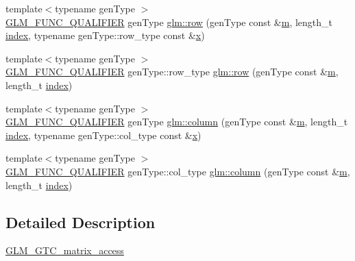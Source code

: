 \begin{DoxyCompactItemize}
\item 
{\footnotesize template$<$typename gen\+Type $>$ }\\\mbox{\hyperlink{setup_8hpp_a33fdea6f91c5f834105f7415e2a64407}{G\+L\+M\+\_\+\+F\+U\+N\+C\+\_\+\+Q\+U\+A\+L\+I\+F\+I\+ER}} gen\+Type \mbox{\hyperlink{group__gtc__matrix__access_gaadcc64829aadf4103477679e48c7594f}{glm\+::row}} (gen\+Type const \&\mbox{\hyperlink{_s_d_l__opengl__glext_8h_af593500c283bf1a787a6f947f503a5c2}{m}}, length\+\_\+t \mbox{\hyperlink{_s_d_l__opengl__glext_8h_a57f14e05b1900f16a2da82ade47d0c6d}{index}}, typename gen\+Type\+::row\+\_\+type const \&\mbox{\hyperlink{_s_d_l__opengl_8h_ad0e63d0edcdbd3d79554076bf309fd47}{x}})
\item 
{\footnotesize template$<$typename gen\+Type $>$ }\\\mbox{\hyperlink{setup_8hpp_a33fdea6f91c5f834105f7415e2a64407}{G\+L\+M\+\_\+\+F\+U\+N\+C\+\_\+\+Q\+U\+A\+L\+I\+F\+I\+ER}} gen\+Type\+::row\+\_\+type \mbox{\hyperlink{group__gtc__matrix__access_ga259e5ebd0f31ec3f83440f8cae7f5dba}{glm\+::row}} (gen\+Type const \&\mbox{\hyperlink{_s_d_l__opengl__glext_8h_af593500c283bf1a787a6f947f503a5c2}{m}}, length\+\_\+t \mbox{\hyperlink{_s_d_l__opengl__glext_8h_a57f14e05b1900f16a2da82ade47d0c6d}{index}})
\item 
{\footnotesize template$<$typename gen\+Type $>$ }\\\mbox{\hyperlink{setup_8hpp_a33fdea6f91c5f834105f7415e2a64407}{G\+L\+M\+\_\+\+F\+U\+N\+C\+\_\+\+Q\+U\+A\+L\+I\+F\+I\+ER}} gen\+Type \mbox{\hyperlink{group__gtc__matrix__access_ga9e757377523890e8b80c5843dbe4dd15}{glm\+::column}} (gen\+Type const \&\mbox{\hyperlink{_s_d_l__opengl__glext_8h_af593500c283bf1a787a6f947f503a5c2}{m}}, length\+\_\+t \mbox{\hyperlink{_s_d_l__opengl__glext_8h_a57f14e05b1900f16a2da82ade47d0c6d}{index}}, typename gen\+Type\+::col\+\_\+type const \&\mbox{\hyperlink{_s_d_l__opengl_8h_ad0e63d0edcdbd3d79554076bf309fd47}{x}})
\item 
{\footnotesize template$<$typename gen\+Type $>$ }\\\mbox{\hyperlink{setup_8hpp_a33fdea6f91c5f834105f7415e2a64407}{G\+L\+M\+\_\+\+F\+U\+N\+C\+\_\+\+Q\+U\+A\+L\+I\+F\+I\+ER}} gen\+Type\+::col\+\_\+type \mbox{\hyperlink{group__gtc__matrix__access_ga96022eb0d3fae39d89fc7a954e59b374}{glm\+::column}} (gen\+Type const \&\mbox{\hyperlink{_s_d_l__opengl__glext_8h_af593500c283bf1a787a6f947f503a5c2}{m}}, length\+\_\+t \mbox{\hyperlink{_s_d_l__opengl__glext_8h_a57f14e05b1900f16a2da82ade47d0c6d}{index}})
\end{DoxyCompactItemize}


\subsection{Detailed Description}
\mbox{\hyperlink{group__gtc__matrix__access}{G\+L\+M\+\_\+\+G\+T\+C\+\_\+matrix\+\_\+access}} 